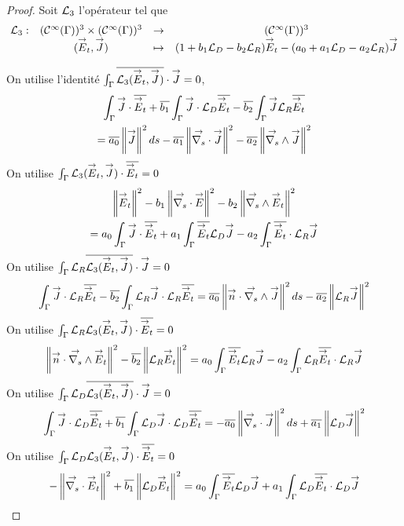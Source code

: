   \begin{proof}
    Soit \(\mathcal{L}_3\) l'opérateur tel que
    \begin{equation}
      \label{eq:unicite:ci3:L3}
      \begin{matrix}
      \LL_3:& (\mathcal{C}^\infty(\Gamma))^3 \times (\mathcal{C}^\infty(\Gamma))^3 & \rightarrow & (\mathcal{C}^\infty(\Gamma))^3
      \\
      &(\vE_t,\vJ) & \mapsto & ( 1 + b_1 \LD - b_2 \LR) \vE_t - (a_0 + a_1 \LD - a_2 \LR ) \vJ
      \end{matrix}
    \end{equation}

    On utilise l'identité \(\int_\Gamma {\overline{\mathcal{L}_3({\overset{\rightarrow}{E}}_t,{\overset{\rightarrow}{J}})}}\cdot {\overset{\rightarrow}{J}} = 0\),
    \begin{multline}
      \label{eq:unicite:ci3:csu3-1}
      \int_\Gamma \vJ \cdot \conj{\vE_t}   + \conj{b_1} \int_\Gamma \vJ\cdot \LD\conj{\vE_t}  - \conj{b_2} \int_\Gamma \vJ \LR\conj{\vE_t}  \\
      = \conj{a_0} \norm{\vJ}^2ds - \conj{a_1} \norm{\vdivs \vJ}^2  - \conj{a_2} \norm{\vrots \vJ}^2 
    \end{multline}
    On utilise \(\int_\Gamma {\mathcal{L}_3({\overset{\rightarrow}{E}}_t,{\overset{\rightarrow}{J}})}\cdot {\overline{{\overset{\rightarrow}{E}}_t}} = 0\)
    \begin{multline}
      \label{eq:unicite:ci3:csu3-2}
      \norm{\vE_t}^2   - b_1 \norm{ \vdivs \vE }^2  - b_2 \norm{\vrots \vE_t}^2  \\
      = a_0 \int_\Gamma \vJ\cdot \conj{\vE_t} + a_1 \int_\Gamma \conj{\vE_t} \LD \vJ  - a_2 \int_\Gamma \conj{\vE_t} \cdot \LR \vJ 
    \end{multline}
    On utilise \(\int_\Gamma {\mathcal{L}_R}{\overline{\mathcal{L}_3({\overset{\rightarrow}{E}}_t,{\overset{\rightarrow}{J}})}}\cdot{\overset{\rightarrow}{J}} = 0\)
    \begin{equation}
      \label{eq:unicite:ci3:csu3-3}
      \int_\Gamma \vJ \cdot \LR \conj{\vE_t}   - \conj{b_2} \int_\Gamma \LR \vJ \cdot \LR \conj{\vE_t}
      =  \conj{a_0} \norm{\vn \cdot \vrots \vJ}^2ds - \conj{a_2} \norm{ \LR \vJ}^2 
    \end{equation}
    On utilise \(\int_\Gamma {\mathcal{L}_R}{\mathcal{L}_3({\overset{\rightarrow}{E}}_t,{\overset{\rightarrow}{J}})}\cdot{\overline{{\overset{\rightarrow}{E}}_t}}=0\)
    \begin{equation}
      \label{eq:unicite:ci3:csu3-4}
      \norm{ \vn \cdot \vrots \vE_t }^2   - \conj{b_2} \norm{ \LR \vE_t}^2 
      = a_0 \int_\Gamma \conj{\vE_t} \LR \vJ  - a_2 \int_\Gamma \LR \conj{\vE_t} \cdot \LR \vJ 
    \end{equation}
    On utilise \(\int_\Gamma {\mathcal{L}_D}{\overline{\mathcal{L}_3({\overset{\rightarrow}{E}}_t,{\overset{\rightarrow}{J}})}}\cdot{\overset{\rightarrow}{J}}=0\)
    \begin{equation}
      \label{eq:unicite:ci3:csu3-5}
      \int_\Gamma \vJ \cdot \LD \conj{\vE_t}   + \conj{b_1} \int_\Gamma \LD \vJ \cdot \LD \conj{\vE_t}
      = - \conj{a_0} \norm{\vdivs \vJ}^2ds + \conj{a_1} \norm{ \LD \vJ}^2 
    \end{equation}
    On utilise \(\int_\Gamma {\mathcal{L}_D}{\mathcal{L}_3({\overset{\rightarrow}{E}}_t,{\overset{\rightarrow}{J}})}\cdot{\overline{{\overset{\rightarrow}{E}}_t}}=0\)
    \begin{equation}
      \label{eq:unicite:ci3:csu3-6}
      -\norm{ \vdivs \vE_t }^2   + \conj{b_1} \norm{ \LD \vE_t}^2
      = a_0 \int_\Gamma \conj{\vE_t} \LD \vJ  + a_1 \int_\Gamma \LD \conj{\vE_t} \cdot \LD \vJ 
    \end{equation}


\end{proof}

